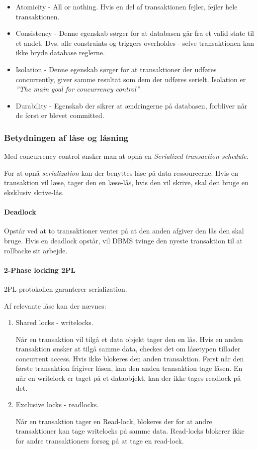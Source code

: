 \begin{itemize}
	\item Atomicity - All or nothing. Hvis en del af transaktionen fejler, fejler hele transaktionen.
	\item Consistency - Denne egenskab sørger for at databasen går fra et valid state til et andet. Dvs. alle constraints og triggers overholdes - selve transaktionen kan ikke bryde database reglerne.
	\item Isolation - Denne egenskab sørger for at transaktioner der udføres concurrently, giver samme resultat som dem der udføres serielt. Isolation er \textit{''The main goal for concurrency control''}
	\item Durability - Egenskab der sikrer at ændringerne på databasen, forbliver når de først er blevet committed.
\end{itemize}
\subsubsection{Betydningen af låse og låsning}

Med concurrency control ønsker man at opnå en \textit{Serialized transaction schedule}.

For at opnå \textit{serialization} kan der benyttes låse på data ressourcerne. Hvis en transaktion vil læse, tager den en læse-lås, hvis den vil skrive, skal den bruge en eksklusiv skrive-lås.

\paragraph{Deadlock}
Opstår ved at to transaktioner venter på at den anden afgiver den lås den skal bruge.
Hvis en deadlock opstår, vil DBMS tvinge den nyeste transaktion til at rollbacke sit arbejde.

\paragraph{2-Phase locking 2PL}
2PL protokollen garanterer serialization.

Af relevante låse kan der nævnes:

\begin{enumerate}
	\item Shared locks - writelocks.
	
	Når en transaktion vil tilgå et data objekt tager den en lås. Hvis en anden transaktion ønsker at tilgå samme data, checkes det om låsetypen tillader concurrent access. Hvis ikke blokeres den anden transaktion. Først når den første transaktion frigiver låsen, kan den anden transaktion tage låsen. En når en writelock er taget på et dataobjekt, kan der ikke tages readlock på det.
	
	\item Exclusive locks - readlocks.
	
	Når en transaktion tager en Read-lock, blokeres der for at andre transaktioner kan tage writelocks på samme data.
	Read-locks blokerer ikke for andre transaktioners forsøg på at tage en read-lock.
\end{enumerate}

